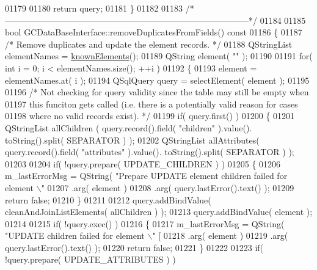 \begin{DoxyCode}
{{{{{{{{{{{{{{{{{{{{{{{{{{{{{{{{{{{{{{{{{{{01179 
01180   \textcolor{keywordflow}{return} query;
01181 \}
01182 
01183 \textcolor{comment}{/*
      --------------------------------------------------------------------------------------*/}
01184 
01185 \textcolor{keywordtype}{bool} GCDataBaseInterface::removeDuplicatesFromFields()\textcolor{keyword}{ const}
01186 \textcolor{keyword}{}\{
01187   \textcolor{comment}{/* Remove duplicates and update the element records. */}
01188   QStringList elementNames = \hyperlink{class_g_c_data_base_interface_a6c4eabd4f39a1c23ab320bb0dbc855d4}{knownElements}();
01189   QString element( \textcolor{stringliteral}{""} );
01190 
01191   \textcolor{keywordflow}{for}( \textcolor{keywordtype}{int} i = 0; i < elementNames.size(); ++i )
01192   \{
01193     element = elementNames.at( i );
01194     QSqlQuery query = selectElement( element );
01195 
01196     \textcolor{comment}{/* Not checking for query validity since the table may still be empty when}
01197 \textcolor{comment}{      this funciton gets called (i.e. there is a potentially valid reason for
       cases}
01198 \textcolor{comment}{      where no valid records exist). */}
01199     \textcolor{keywordflow}{if}( query.first() )
01200     \{
01201       QStringList allChildren  ( query.record().field( \textcolor{stringliteral}{"children"} ).value().
      toString().split( SEPARATOR ) );
01202       QStringList allAttributes( query.record().field( \textcolor{stringliteral}{"attributes"} ).value().
      toString().split( SEPARATOR ) );
01203 
01204       \textcolor{keywordflow}{if}( !query.prepare( UPDATE\_CHILDREN ) )
01205       \{
01206         m\_lastErrorMsg = QString( \textcolor{stringliteral}{"Prepare UPDATE element children failed for
       element \(\backslash\)"%
01207                          .arg( element )
01208                          .arg( query.lastError().text() );
01209         \textcolor{keywordflow}{return} \textcolor{keyword}{false};
01210       \}
01211 
01212       query.addBindValue( cleanAndJoinListElements( allChildren ) );
01213       query.addBindValue( element );
01214 
01215       \textcolor{keywordflow}{if}( !query.exec() )
01216       \{
01217         m\_lastErrorMsg = QString( \textcolor{stringliteral}{"UPDATE children failed for element \(\backslash\)"%
       [%
01218                          .arg( element )
01219                          .arg( query.lastError().text() );
01220         \textcolor{keywordflow}{return} \textcolor{keyword}{false};
01221       \}
01222 
01223       \textcolor{keywordflow}{if}( !query.prepare( UPDATE\_ATTRIBUTES ) )
}}}}}}}}}}}}}}}}}}}}}}}}}}}}}}}}}}}}}}}}}}}}}
\end{DoxyCode}
